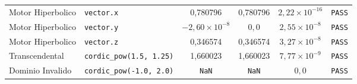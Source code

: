 \begin{table}[htbp]
{\begin{tabular}{llcccc}
Motor Hiperbolico & \texttt{vector.x} & 0,780796 & 0,780796 & $2,22 \times 10^{-16}$ & \texttt{PASS} \\
Motor Hiperbolico & \texttt{vector.y} & $-2,60 \times 10^{-8}$ & $0{,}0$ & $2,55 \times 10^{-8}$ & \texttt{PASS} \\
Motor Hiperbolico & \texttt{vector.z} & 0,346574 & 0,346574 & $3,27 \times 10^{-8}$ & \texttt{PASS} \\
Transcendental & \texttt{cordic\_pow(1.5, 1.25)} & 1,660023 & 1,660023 & $7,77 \times 10^{-9}$ & \texttt{PASS} \\
Dominio Invalido & \texttt{cordic\_pow(-1.0, 2.0)} & \texttt{NaN} & \texttt{NaN} & $0{,}0$ & \texttt{PASS} \\
\hline
\end{tabular}%
}
\end{table}